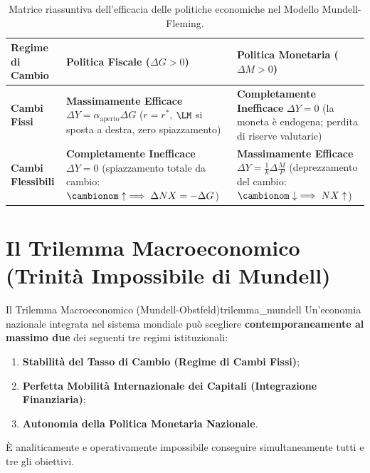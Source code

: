 \begin{table}[htbp]
\centering
\small
\renewcommand{\arraystretch}{1.4}
\begin{tabularx}{\textwidth}{l X X}
\toprule
\textbf{Regime di Cambio} & \textbf{Politica Fiscale ($\Delta G > 0$)} & \textbf{Politica Monetaria ($\Delta M > 0$)} \\
\midrule
\textbf{Cambi Fissi} & 
\textbf{Massimamente Efficace}\newline
$\Delta Y = \alpha_{\text{aperto}} \Delta G$\newline
($r = r^*$, $\LM$ si sposta a destra, zero spiazzamento) & 
\textbf{Completamente Inefficace}\newline
$\Delta Y = 0$\newline
(la moneta è endogena; perdita di riserve valutarie) \\
\midrule
\textbf{Cambi Flessibili} & 
\textbf{Completamente Inefficace}\newline
$\Delta Y = 0$\newline
(spiazzamento totale da cambio: $\cambionom \uparrow \implies \Delta NX = -\Delta G$) & 
\textbf{Massimamente Efficace}\newline
$\Delta Y = \frac{1}{k}\Delta \frac{M}{P}$\newline
(deprezzamento del cambio: $\cambionom \downarrow \implies NX \uparrow$) \\
\bottomrule
\end{tabularx}
\caption{Matrice riassuntiva dell'efficacia delle politiche economiche nel Modello Mundell-Fleming.}
\label{tab:sinottico_mundell_fleming}
\end{table}

\section{Il Trilemma Macroeconomico (Trinità Impossibile di Mundell)}

\begin{teorema}{Il Trilemma Macroeconomico (Mundell-Obstfeld)}{trilemma_mundell}
Un'economia nazionale integrata nel sistema mondiale può scegliere \textbf{contemporaneamente al massimo due} dei seguenti tre regimi istituzionali:
\begin{enumerate}
    \item \textbf{Stabilità del Tasso di Cambio (Regime di Cambi Fissi)};
    \item \textbf{Perfetta Mobilità Internazionale dei Capitali (Integrazione Finanziaria)};
    \item \textbf{Autonomia della Politica Monetaria Nazionale}.
\end{enumerate}
È analiticamente e operativamente impossibile conseguire simultaneamente tutti e tre gli obiettivi.
\end{teorema}

